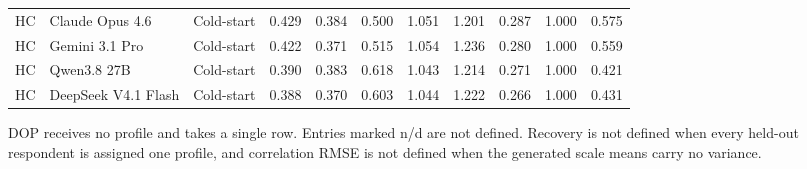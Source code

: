 \begin{table}[pos=!htbp]
\begin{tabular*}{\textwidth}{@{\extracolsep{\fill}}lllcccccccc@{}}
HC & Claude Opus 4.6 & Cold-start & 0.429 & 0.384 & 0.500 & 1.051 & 1.201 & 0.287 & 1.000 & 0.575 \\
HC & Gemini 3.1 Pro & Cold-start & 0.422 & 0.371 & 0.515 & 1.054 & 1.236 & 0.280 & 1.000 & 0.559 \\
HC & Qwen3.8 27B & Cold-start & 0.390 & 0.383 & 0.618 & 1.043 & 1.214 & 0.271 & 1.000 & 0.421 \\
HC & DeepSeek V4.1 Flash & Cold-start & 0.388 & 0.370 & 0.603 & 1.044 & 1.222 & 0.266 & 1.000 & 0.431 \\
\bottomrule
\end{tabular*}
\par\smallskip
\scriptsize DOP receives no profile and takes a single row. Entries marked n/d are not defined. Recovery is not defined when every held-out respondent is assigned one profile, and correlation RMSE is not defined when the generated scale means carry no variance.
\end{table}

